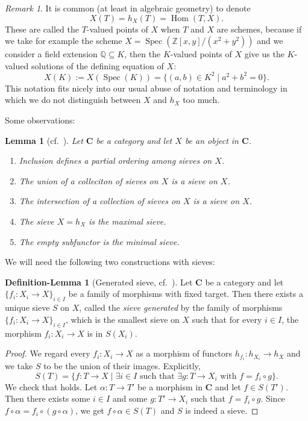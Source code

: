 \documentclass[12pt,reqno,a4paper]{amsart}
\theoremstyle{plain}
\newtheorem{lm}[thm]{Lemma}
\theoremstyle{definition}
\newtheorem{defnlm}[thm]{Definition-Lemma}
\theoremstyle{remark}
\newtheorem{rem}[thm]{Remark}
\begin{document}
\begin{rem}
  It is common (at least in algebraic geometry) to denote
  \[ X(T) = h_{X}(T) = \operatorname{Hom}(T,X). \]
  These are called the $T$-valued points of $X$ when $T$ and $X$ are schemes, because if we take for example the scheme $X = \operatorname{Spec}(\mathbb{Z}[x,y]/(x^{2} + y^{2}))$ and we consider a field extension $\mathbb{Q} \subseteq K$, then the $K$-valued points of $X$ give us the $K$-valued solutions of the defining equation of $X$:
  \[ X(K) := X(\operatorname{Spec}(K)) = \{ (a,b) \in K^{2} \mid a^{2} + b^{2} = 0\}. \]
  This notation fits nicely into our usual abuse of notation and terminology in which we do not distinguish between $X$ and $h_{X}$ too much.
\end{rem}

Some observations:

\begin{lm}[{cf.~\cite[\href{https://stacks.math.columbia.edu/tag/00YZ}{Tag 00YZ}]{stacks-project}}]
  Let $\mathbf{C}$ be a category and let $X$ be an object in $\mathbf{C}$.
  \begin{enumerate}
    \item Inclusion defines a partial ordering among sieves on $X$.
    \item The union of a colleciton of sieves on $X$ is a sieve on $X$.
    \item The intersection of a collection of sieves on $X$ is a sieve on $X$.
    \item The sieve $X = h_{X}$ is the maximal sieve.
    \item The empty subfunctor is the minimal sieve.
  \end{enumerate}
\end{lm}

We will need the following two constructions with sieves:

\begin{defnlm}[Generated sieve, {cf.~\cite[\href{https://stacks.math.columbia.edu/tag/00Z1}{Tag 00Z1}]{stacks-project}}]\label{defnlm:generated}
  Let $\mathbf{C}$ be a category and let $\{ f_{i} \colon X_{i} \to X \}_{i \in I}$ be a family of morphisms with fixed target.
  Then there exists a unique sieve $S$ on $X$, called the \textit{sieve generated} by the family of morphisms $\{ f_{i} \colon X_{i} \to X \}_{i \in I}$, which is the smallest sieve on $X$ such that for every $i \in I$, the morphism $f_{i} \colon X_{i} \to X$ is in $S(X_{i})$.
  \begin{proof}
    We regard every $f_{i} \colon X_{i} \to X$ as a morphism of functors $h_{f_{i}} \colon h_{X_{i}} \to h_{X}$ and we take $S$ to be the union of their images.
    Explicitly,
    \[ S(T) = \{ f \colon T \to X \mid \exists i \in I \text{ such that } \exists g \colon T \to X_{i} \text{ with } f = f_{i} \circ g \}. \]
    We check that  holds.
    Let $\alpha \colon T \to T'$ be a morphism in $\mathbf{C}$ and let $f \in S(T')$.
    Then there exists some $i \in I$ and some $g \colon T' \to X_{i}$ such that $f = f_{i} \circ g$.
    Since $f \circ \alpha = f_{i} \circ (g \circ \alpha)$, we get $f \circ \alpha \in S(T)$ and $S$ is indeed a sieve.
  \end{proof}
\end{defnlm}
\end{document}
